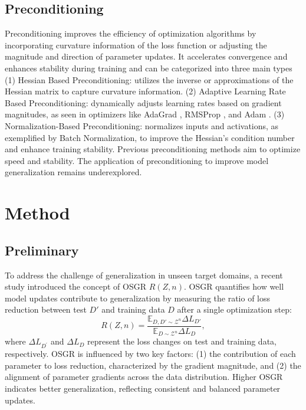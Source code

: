 \documentclass{article}
\theoremstyle{plain}
\theoremstyle{definition}
\theoremstyle{remark}
\begin{document}
\subsection{Preconditioning}
Preconditioning improves the efficiency of optimization algorithms by incorporating curvature information of the loss function or adjusting the magnitude and direction of parameter updates. It accelerates convergence and enhances stability during training and can be categorized into three main types \cite{precondition_3, Preconditioning_generalization} (1) Hessian Based Preconditioning: utilizes the inverse or approximations of the Hessian matrix to capture curvature information. \cite{Newton_method,Quasi-Newton_Method} (2) Adaptive Learning Rate Based Preconditioning: dynamically adjusts learning rates based on gradient magnitudes, as seen in optimizers like AdaGrad \cite{adagrad}, RMSProp \cite{rmsprop}, and Adam \cite{adam}. (3) Normalization-Based Preconditioning: normalizes inputs and activations, as exemplified by Batch Normalization\cite{Batch_Normalization}, to improve the Hessian’s condition number and enhance training stability. Previous preconditioning methods aim to optimize speed and stability. The application of preconditioning to improve model generalization remains underexplored.

\section{Method}
\subsection{Preliminary}
To address the challenge of generalization in unseen target domains, a recent study\cite{gsnr} introduced the concept of OSGR \(R(Z, n)\). OSGR quantifies how well model updates contribute to generalization by measuring the ratio of loss reduction between test \(D'\) and training data \(D\) after a single optimization step:
\begin{equation}
R(Z,n) = \frac{\mathbb{E}_{D,D' \sim \mathcal{Z}^n} \Delta L_{D'}}{\mathbb{E}_{D \sim \mathcal{Z}^n} \Delta L_D},
\end{equation}
where $\Delta L_{D^\prime}$ and $\Delta L_D$ represent the loss changes on test and training data, respectively.
OSGR is influenced by two key factors: (1) the contribution of each parameter to loss reduction, characterized by the gradient magnitude, and (2) the alignment of parameter gradients across the data distribution. Higher OSGR indicates better generalization, reflecting consistent and balanced parameter updates.
\end{document}
